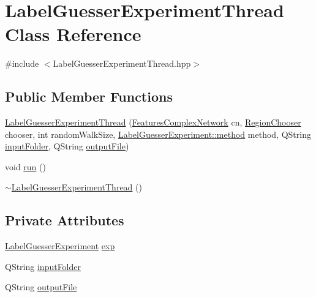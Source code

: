 \hypertarget{class_label_guesser_experiment_thread}{\section{Label\+Guesser\+Experiment\+Thread Class Reference}
\label{class_label_guesser_experiment_thread}
}


{\ttfamily \#include $<$Label\+Guesser\+Experiment\+Thread.\+hpp$>$}

\subsection*{Public Member Functions}
\begin{DoxyCompactItemize}
\item 
\hyperlink{class_label_guesser_experiment_thread_af563cdb53fb8c2f579f5e6708848043f}{Label\+Guesser\+Experiment\+Thread} (\hyperlink{class_features_complex_network}{Features\+Complex\+Network} cn, \hyperlink{class_region_chooser}{Region\+Chooser} chooser, int random\+Walk\+Size, \hyperlink{class_label_guesser_experiment_a8c3db06a56bf1ad7513c20a7b80da3ec}{Label\+Guesser\+Experiment\+::method} method, Q\+String \hyperlink{class_label_guesser_experiment_thread_a4b4ae486ed39a8503d4a30898bab7134}{input\+Folder}, Q\+String \hyperlink{class_label_guesser_experiment_thread_a1fb47063f7328e9497216864ce95c51d}{output\+File})
\item 
void \hyperlink{class_label_guesser_experiment_thread_a816873e28a48cdefc4acd4688bd4b44f}{run} ()
\item 
\hyperlink{class_label_guesser_experiment_thread_a6efac1fdb594ba4c500a790fe4ce79dd}{$\sim$\+Label\+Guesser\+Experiment\+Thread} ()
\end{DoxyCompactItemize}
\subsection*{Private Attributes}
\begin{DoxyCompactItemize}
\item 
\hyperlink{class_label_guesser_experiment}{Label\+Guesser\+Experiment} \hyperlink{class_label_guesser_experiment_thread_ab6ed283c5b4ae8272dc1a2fb872ce4bd}{exp}
\item 
Q\+String \hyperlink{class_label_guesser_experiment_thread_a4b4ae486ed39a8503d4a30898bab7134}{input\+Folder}
\item 
Q\+String \hyperlink{class_label_guesser_experiment_thread_a1fb47063f7328e9497216864ce95c51d}{output\+File}
\end{DoxyCompactItemize}


